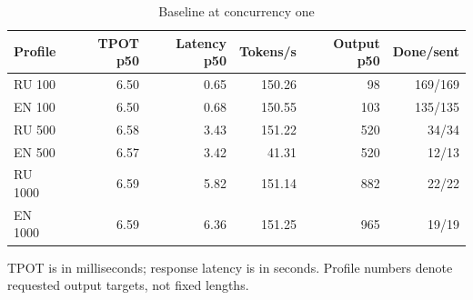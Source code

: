\begin{table}[htbp]
\centering
\caption{Baseline at concurrency one}
\label{tab:c1}
\begin{singlespace}
\small
\setlength{\tabcolsep}{4pt}
\renewcommand{\arraystretch}{1.2}
\begin{tabular}{@{}lrrrrr@{}}
\toprule
Profile & TPOT p50 & Latency p50 & Tokens/s & Output p50 & Done/sent \\
\midrule
RU 100 & 6.50 & 0.65 & 150.26 & 98 & 169/169 \\
EN 100 & 6.50 & 0.68 & 150.55 & 103 & 135/135 \\
RU 500 & 6.58 & 3.43 & 151.22 & 520 & 34/34 \\
EN 500 & 6.57 & 3.42 & 41.31 & 520 & 12/13 \\
RU 1000 & 6.59 & 5.82 & 151.14 & 882 & 22/22 \\
EN 1000 & 6.59 & 6.36 & 151.25 & 965 & 19/19 \\
\bottomrule
\end{tabular}
\par\smallskip\raggedright TPOT is in milliseconds; response latency is in seconds. Profile numbers denote requested output targets, not fixed lengths.
\end{singlespace}
\end{table}
